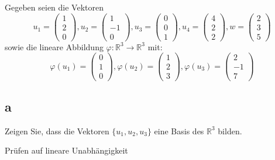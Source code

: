 Gegeben seien die Vektoren
\[
    u_1 = \begin{pmatrix}
        1 \\ 2 \\ 0
    \end{pmatrix}, u_2 = \begin{pmatrix}
        1 \\ -1 \\ 0
    \end{pmatrix}, u_3 = \begin{pmatrix}
        0 \\ 0 \\ 1
    \end{pmatrix}, u_4 = \begin{pmatrix}
        4 \\ 2 \\ 2
    \end{pmatrix}, w = \begin{pmatrix}
        2 \\ 3 \\ 5
    \end{pmatrix}
\]
sowie die lineare Abbildung $\varphi: \mathbb{R}^3 \rightarrow \mathbb{R}^3$
mit:
\[
    \varphi(u_1) = \begin{pmatrix}
        0 \\ 1 \\ 0
    \end{pmatrix},
    \varphi(u_2) = \begin{pmatrix}
        1 \\ 2 \\ 3
    \end{pmatrix},
    \varphi(u_3) = \begin{pmatrix}
        2 \\ -1 \\ 7
    \end{pmatrix}
\]

\subsection{a}
Zeigen Sie, dass die Vektoren $\{u_1, u_2, u_3\}$ eine Basis des $\mathbb{R}^3$
bilden.

Prüfen auf lineare Unabhängigkeit

